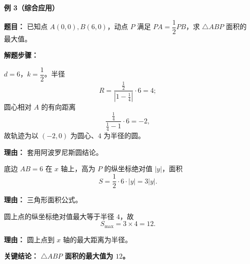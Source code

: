 \begin{examplebox}
	\medskip
	\textbf{\textcolor{CExample}{例 3（综合应用）}}

	\textbf{\textcolor{CExample}{题目：}} 已知点 $A(0,0),B(6,0)$，动点 $P$ 满足 $PA=\dfrac{1}{2}PB$，求 $\triangle ABP$ 面积的最大值。

	\textbf{\textcolor{CExample}{解题步骤：}}
	\begin{description}[style=nextline, leftmargin=2.8em, labelsep=0.5em, itemsep=0.45em]
		\item[\textbf{第一步（得轨迹）：}]
		      $d=6$，$k=\dfrac{1}{2}$。半径
		      \[
			      R=\frac{\frac{1}{2}}{\left|1-\frac{1}{4}\right|}\cdot 6=4;
		      \]
		      圆心相对 $A$ 的有向距离
		      \[
			      \frac{\frac{1}{4}}{\frac{1}{4}-1}\cdot 6=-2,
		      \]
		      故轨迹为以 $(-2,0)$ 为圆心、$4$ 为半径的圆。
		      \par\textbf{理由：} 套用阿波罗尼斯圆结论。
		\item[\textbf{第二步（面积表示）：}]
		      底边 $AB=6$ 在 $x$ 轴上，高为 $P$ 的纵坐标绝对值 $|y|$，面积
		      \[
			      S=\frac{1}{2}\cdot 6\cdot |y|=3|y|.
		      \]
		      \par\textbf{理由：} 三角形面积公式。
		\item[\textbf{第三步（求最值）：}]
		      圆上点的纵坐标绝对值最大等于半径 $4$，故
		      \[
			      S_{\max}=3\times 4=12.
		      \]
		      \par\textbf{理由：} 圆上点到 $x$ 轴的最大距离为半径。
	\end{description}
	\textbf{\textcolor{CExample}{关键结论：}} \textbf{$\triangle ABP$ 面积的最大值为 $12$。}
\end{examplebox}